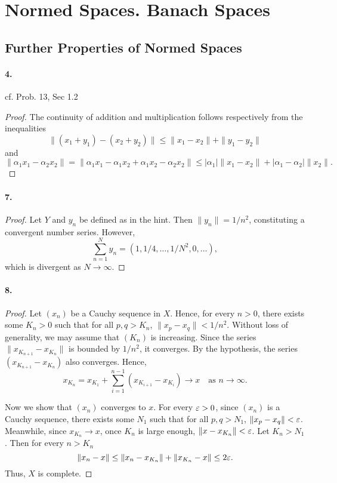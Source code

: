 \section{Normed Spaces. Banach Spaces}
\setcounter{subsection}{2}
\subsection{Further Properties of Normed Spaces}
  \paragraph{4.}
    cf. Prob. 13, Sec 1.2
  \begin{proof}
    The continuity of addition and multiplication follows respectively from the
    inequalities
    \[
      \|(x_1+y_1)-(x_2+y_2)\| \le \|x_1-x_2\|+\|y_1-y_2\|
    \]
    and 
    \[
      \|\alpha_1x_1-\alpha_2x_2\| = 
      \|\alpha_1x_1-\alpha_1x_2+\alpha_1x_2-\alpha_2x_2\|
      \le |\alpha_1|\|x_1-x_2\| + |\alpha_1-\alpha_2|\|x_2\|.
    \]
  \end{proof}

  \paragraph{7.}
  \begin{proof}
    Let $Y$ and $y_n$ be defined as in the hint. Then $\|y_n\|=1/n^2$, 
    constituting a convergent number series. However, 
    \[
      \sum_{n=1}^N y_n = (1,1/4, \dots, 1/N^2, 0,\dots),
    \]
    which is divergent as $N\to\infty$.
  \end{proof}

  \paragraph{8.}
  \begin{proof}
    Let $(x_n)$ be a Cauchy sequence in $X$. Hence, for every $n>0$, there 
    exists some $K_n>0$ such that for all $p,q>K_n$, $\|x_p-x_q\|<1/n^2$. 
    Without loss of generality, we may assume that $(K_n)$ is increasing. Since
    the series $\|x_{K_{n+1}}-x_{K_n}\|$ is bounded by $1/n^2$, it converges. 
    By the hypothesis, the series $(x_{K_{n+1}}-x_{K_n})$ also converges. Hence, 
    \[
      x_{K_n} = x_{K_1} + \sum_{i=1}^{n-1}(x_{K_{i+1}}-x_{K_i}) \to x
      \quad\text{as } n\to\infty.
    \]\par
    Now we show that $(x_n)$ converges to $x$. For every $\varepsilon>0$, since $(x_n)$
    is a Cauchy sequence, there exists some $N_1$ such that for all $p,q>N_1$,
    $\|x_p-x_q\|<\varepsilon$. Meanwhile, since $x_{K_n}\to x$, once $K_n$ is large
    enough, $\|x-x_{K_n}\|<\varepsilon$. Let $K_n>N_1$. Then for every $n>K_n$
    \[
      \|x_n-x\| \le \|x_n-x_{K_n}\| + \|x_{K_n}-x\| \le 2\varepsilon.
    \]
    Thus, $X$ is complete.
  \end{proof}

